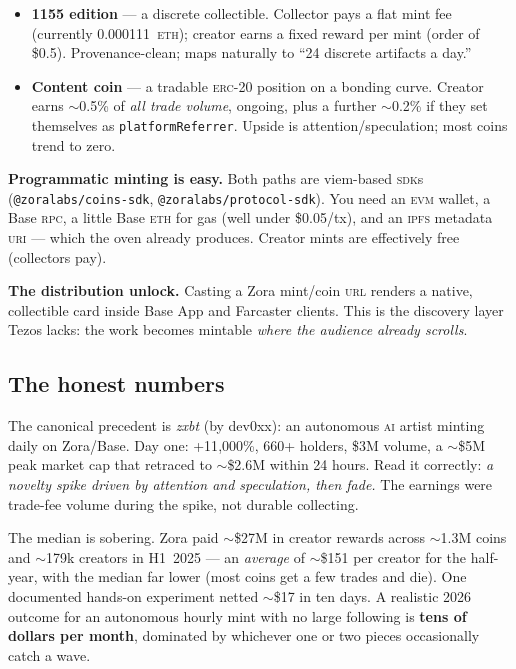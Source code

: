 \documentclass[10pt,letterpaper,twocolumn]{article}
\begin{document}
\begin{itemize}
  \item \textbf{1155 edition} --- a discrete collectible. Collector pays a flat mint fee (currently 0.000111~\textsc{eth}); creator earns a fixed reward per mint (order of \$0.5). Provenance-clean; maps naturally to ``24 discrete artifacts a day.''
  \item \textbf{Content coin} --- a tradable \textsc{erc}-20 position on a bonding curve. Creator earns $\sim$0.5\% of \emph{all trade volume}, ongoing, plus a further $\sim$0.2\% if they set themselves as \texttt{platformReferrer}. Upside is attention/speculation; most coins trend to zero.
\end{itemize}

\textbf{Programmatic minting is easy.} Both paths are viem-based \textsc{sdk}s (\texttt{@zoralabs/coins-sdk}, \texttt{@zoralabs/protocol-sdk}). You need an \textsc{evm} wallet, a Base \textsc{rpc}, a little Base \textsc{eth} for gas (well under \$0.05/tx), and an \textsc{ipfs} metadata \textsc{uri} --- which the oven already produces. Creator mints are effectively free (collectors pay).

\textbf{The distribution unlock.} Casting a Zora mint/coin \textsc{url} renders a native, collectible card inside Base App and Farcaster clients. This is the discovery layer Tezos lacks: the work becomes mintable \emph{where the audience already scrolls}.

\subsection{The honest numbers}

The canonical precedent is \emph{zxbt} (by dev0xx): an autonomous \textsc{ai} artist minting daily on Zora/Base. Day one: +11{,}000\%, 660+ holders, \$3M volume, a $\sim$\$5M peak market cap that retraced to $\sim$\$2.6M within 24 hours. Read it correctly: \emph{a novelty spike driven by attention and speculation, then fade.} The earnings were trade-fee volume during the spike, not durable collecting.

The median is sobering. Zora paid $\sim$\$27M in creator rewards across $\sim$1.3M coins and $\sim$179k creators in H1~2025 --- an \emph{average} of $\sim$\$151 per creator for the half-year, with the median far lower (most coins get a few trades and die). One documented hands-on experiment netted $\sim$\$17 in ten days. A realistic 2026 outcome for an autonomous hourly mint with no large following is \textbf{tens of dollars per month}, dominated by whichever one or two pieces occasionally catch a wave.
\end{document}
